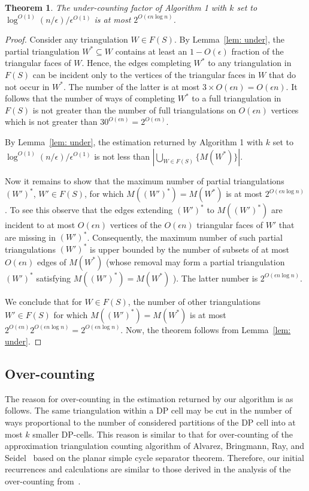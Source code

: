 \documentclass[a4paper]{article}
\newtheorem{theorem}{Theorem}
\begin{document}
\begin{theorem} \label{theo: under}
The under-counting factor of
Algorithm 1 with
$k$ set to\\
$\log^{O(1)} (n/\epsilon)/\epsilon^{O(1)}$ is
at most $2^{O(\epsilon n\log n)}$.
\end{theorem}
\begin{proof}
Consider any triangulation $W\in F(S)$.
By Lemma~\ref{lem: under}, the partial triangulation $W^*\subseteq W$
contains at least an $1-O(\epsilon)$ fraction
of the triangular faces of $W$. Hence, the edges
completing $W^*$ to any triangulation in $F(S)$
can be incident only to the vertices of the
triangular faces in $W$ that do not occur
in $W^*$. The number of the latter is at most
$3\times O(\epsilon n)=O(\epsilon n)$. It follows that
the number of ways of completing $W^*$ to a
full triangulation in $F(S)$ is not greater
than the number of full triangulations
on $O(\epsilon n)$ vertices which is
not greater than $30^{O(\epsilon n)}=2^{O(\epsilon n)}$.

By Lemma~\ref{lem: under}, 
the estimation returned by
Algorithm 1 with $k$ set to\\
$\log^{O(1)} (n/\epsilon)/\epsilon^{O(1)}$ is not less
than  $|\bigcup_{W\in F(S)} \{ M(W^*)\}|$.

Now it remains to show that the maximum number of
partial triangulations $(W')^*$, $W'\in F(S)$, for which
$M((W')^*)=M(W^*)$
is at most $2^{O(\epsilon n\log n)}$. To see this
observe that the edges extending $(W')^*$
to $M((W')^*)$ are incident to at most $O(\epsilon n)$
vertices of the $O(\epsilon n)$ triangular faces of $W'$
that are missing in $(W')^*$. Consequently,
the maximum number of such partial triangulations $(W')^*$
is upper bounded by the number of subsets
of at most $O(\epsilon n)$ edges of $M(W^*)$
(whose removal may form a partial triangulation
$(W')^*$ satisfying $M((W')^*)=M(W^*)$ ).
The latter number is $2^{O(\epsilon n \log n)}$.


We conclude that for $W\in F(S)$, 
the number of other triangulations
$W'\in F(S)$ for which $M((W')^*)=M(W^*)$
is at most $2^{O(\epsilon n)}2^{O(\epsilon n\log n)}=
2^{O(\epsilon n\log n)}$. Now, the theorem follows
from Lemma~\ref{lem: under}.
\end{proof}

\subsection{Over-counting}

The reason for over-counting in the estimation
returned by our algorithm is as follows.
The same
triangulation within a DP cell
may be cut in the number of
ways proportional to the number 
of considered partitions of the DP cell into at most $k$
smaller DP-cells. This reason is similar to
that for over-counting of the approximation
triangulation counting algorithm of  Alvarez, Bringmann, Ray, 
and Seidel~\cite{ABRS13}
based on the planar simple cycle separator theorem.
Therefore, 
our initial recurrences and calculations 
are similar to those derived
in the analysis of the over-counting from~\cite{ABRS13}.
\end{document}

